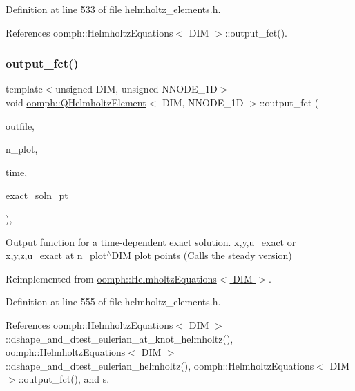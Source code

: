 Definition at line 533 of file helmholtz\+\_\+elements.\+h.



References oomph\+::\+Helmholtz\+Equations$<$ D\+I\+M $>$\+::output\+\_\+fct().

\mbox{\label{classoomph_1_1QHelmholtzElement_ad9aeaf3b84064897747f46590f4f87e3}} 
\subsubsection{\texorpdfstring{output\+\_\+fct()}{output\_fct()}\hspace{0.1cm}{\footnotesize\ttfamily [2/2]}}
{\footnotesize\ttfamily template$<$unsigned D\+IM, unsigned N\+N\+O\+D\+E\+\_\+1D$>$ \\
void \hyperlink{classoomph_1_1QHelmholtzElement}{oomph\+::\+Q\+Helmholtz\+Element}$<$ D\+IM, N\+N\+O\+D\+E\+\_\+1D $>$\+::output\+\_\+fct (\begin{DoxyParamCaption}\item[{std\+::ostream \&}]{outfile,  }\item[{const unsigned \&}]{n\+\_\+plot,  }\item[{const double \&}]{time,  }\item[{\hyperlink{classoomph_1_1FiniteElement_ad4ecf2b61b158a4b4d351a60d23c633e}{Finite\+Element\+::\+Unsteady\+Exact\+Solution\+Fct\+Pt}}]{exact\+\_\+soln\+\_\+pt }\end{DoxyParamCaption})\hspace{0.3cm}{\ttfamily [inline]}, {\ttfamily [virtual]}}



Output function for a time-\/dependent exact solution. x,y,u\+\_\+exact or x,y,z,u\+\_\+exact at n\+\_\+plot$^\wedge$\+D\+IM plot points (Calls the steady version) 



Reimplemented from \hyperlink{classoomph_1_1HelmholtzEquations_abf09295bc42ac5e63b83b3162b94c949}{oomph\+::\+Helmholtz\+Equations$<$ D\+I\+M $>$}.



Definition at line 555 of file helmholtz\+\_\+elements.\+h.



References oomph\+::\+Helmholtz\+Equations$<$ D\+I\+M $>$\+::dshape\+\_\+and\+\_\+dtest\+\_\+eulerian\+\_\+at\+\_\+knot\+\_\+helmholtz(), oomph\+::\+Helmholtz\+Equations$<$ D\+I\+M $>$\+::dshape\+\_\+and\+\_\+dtest\+\_\+eulerian\+\_\+helmholtz(), oomph\+::\+Helmholtz\+Equations$<$ D\+I\+M $>$\+::output\+\_\+fct(), and s.

